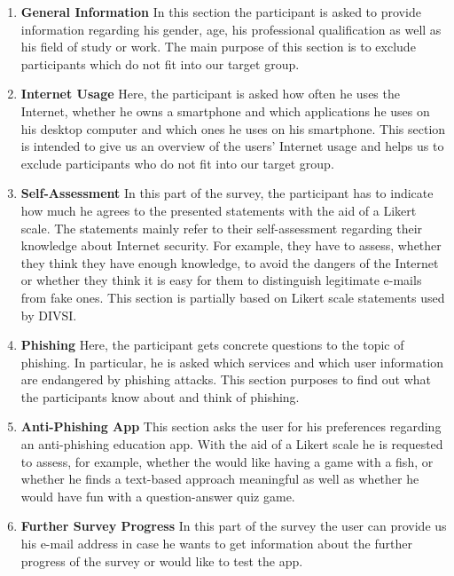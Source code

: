 \begin{enumerate}
	\item \textbf{General Information} In this section the participant is asked to provide information regarding his gender, age, his professional qualification as well as his field of study or work.
 The main purpose of this section is to exclude participants which do not fit into our target group.

	\item \textbf{Internet Usage} Here, the participant is asked how often he uses the Internet, whether he owns a smartphone and which applications he uses on his desktop computer and which ones he uses on his smartphone.
 This section is intended to give us an overview of the users' Internet usage and helps us to exclude participants who do not fit into our target group.

	\item \textbf{Self-Assessment} In this part of the survey, the participant has to indicate how much he agrees to the presented statements with the aid of a Likert scale.
 The statements mainly refer to their self-assessment regarding their knowledge about Internet security.
 For example, they have to assess, whether they think they have enough knowledge, to avoid the dangers of the Internet or whether they think it is easy for them to distinguish legitimate e-mails from fake ones.
 This section is partially based on Likert scale statements used by DIVSI\cite{divsi2012divsi}.
	\item \textbf{Phishing} Here, the participant gets concrete questions to the topic of phishing.
 In particular, he is asked which services and which user information are endangered by phishing attacks.
 This section purposes to find out what the participants know about and think of phishing.

	\item \textbf{Anti-Phishing App} This section asks the user for his preferences regarding an anti-phishing education app.
 With the aid of a Likert scale he is requested to assess, for example, whether the would like having a game with a fish, or whether he finds a text-based approach meaningful as well as whether he would have fun with a question-answer quiz game.

	\item \textbf{Further Survey Progress} In this part of the survey the user can provide us his e-mail address in case he wants to get information about the further progress of the survey or would like to test the app.

\end{enumerate}

